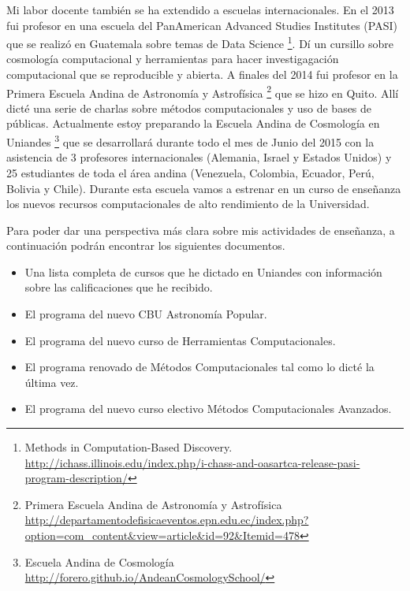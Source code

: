 \documentclass[letterpaper,12pt,onecolumn]{article}
\begin{document}
Mi labor docente tambi\'en se ha extendido a escuelas
internacionales. En el 2013 fui profesor en una escuela del
PanAmerican Advanced Studies Institutes (PASI) que se realiz\'o en
Guatemala sobre temas de Data Science \footnote{Methods in
  Computation-Based
  Discovery. \url{http://ichass.illinois.edu/index.php/i-chass-and-oasartca-release-pasi-program-description/}}. D\'i
un cursillo sobre cosmolog\'ia computacional y herramientas para hacer
investigagaci\'on computacional que se reproducible y abierta. A
finales del 2014 fui profesor en la Primera Escuela Andina de Astronom\'ia y
Astrof\'isica \footnote{Primera Escuela Andina de Astronom\'ia y
  Astrof\'isica \url{http://departamentodefisicaeventos.epn.edu.ec/index.php?option=com_content&view=article&id=92&Itemid=478}}
que se hizo en Quito. All\'i dict\'e una serie de charlas sobre
m\'etodos computacionales y uso de bases de  p\'ublicas. Actualmente
estoy preparando la Escuela Andina de Cosmolog\'ia en
Uniandes \footnote{Escuela Andina de Cosmolog\'ia \url{http://forero.github.io/AndeanCosmologySchool/}}
que se desarrollar\'a durante todo el mes de Junio del 2015 con la
asistencia de 3 profesores internacionales (Alemania, Israel y Estados
Unidos) y 25 estudiantes de toda el \'area andina (Venezuela,
Colombia, Ecuador, Per\'u, Bolivia y Chile). Durante esta escuela
vamos a estrenar en un curso de ense\~nanza los nuevos recursos
computacionales de alto rendimiento de la Universidad.


Para poder dar una perspectiva m\'as clara sobre mis actividades de
ense\~nanza, a continuaci\'on podr\'an encontrar los siguientes documentos.
\begin{itemize}
\item Una lista completa de cursos que he dictado en Uniandes con
  informaci\'on sobre las calificaciones que he recibido. 
\item El programa del nuevo CBU Astronom\'ia Popular.
\item El programa del nuevo curso de Herramientas Computacionales.
\item El programa renovado de M\'etodos Computacionales tal como lo
  dict\'e la \'ultima vez.
\item El programa del nuevo curso electivo M\'etodos Computacionales
  Avanzados. 
\end{itemize}
\end{document}
